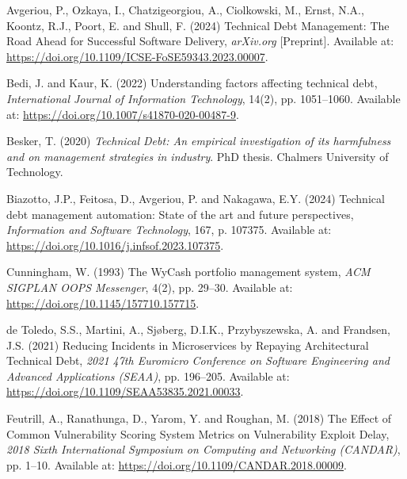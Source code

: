 \documentclass[
  british,
  12pt,
  a4paper,
]{report}
\newlength{\cslhangindent}
\newenvironment{CSLReferences}[2] %
 {\begin{list}{}{%
  \setlength{\itemindent}{0pt}
  \setlength{\leftmargin}{0pt}
  \setlength{\parsep}{0pt}
  \ifodd #1
   \setlength{\leftmargin}{\cslhangindent}
   \setlength{\itemindent}{-1\cslhangindent}
  \fi
  \setlength{\itemsep}{#2\baselineskip}}}
 {\end{list}}
\begin{document}
\begin{CSLReferences}{0}{1}
Avgeriou, P., Ozkaya, I., Chatzigeorgiou, A., Ciolkowski, M., Ernst,
N.A., Koontz, R.J., Poort, E. and Shull, F. (2024)
\textquotesingle Technical {Debt Management}: {The Road Ahead} for
{Successful Software Delivery}\textquotesingle, \emph{arXiv.org}
{[}Preprint{]}. Available at:
\url{https://doi.org/10.1109/ICSE-FoSE59343.2023.00007}.

Bedi, J. and Kaur, K. (2022) \textquotesingle Understanding factors
affecting technical debt\textquotesingle, \emph{International Journal of
Information Technology}, 14(2), pp. 1051--1060. Available at:
\url{https://doi.org/10.1007/s41870-020-00487-9}.

Besker, T. (2020) \emph{Technical {Debt}: {An} empirical investigation
of its harmfulness and on management strategies in industry}. PhD
thesis. Chalmers University of Technology.

Biazotto, J.P., Feitosa, D., Avgeriou, P. and Nakagawa, E.Y. (2024)
\textquotesingle Technical debt management automation: {State} of the
art and future perspectives\textquotesingle, \emph{Information and
Software Technology}, 167, p. 107375. Available at:
\url{https://doi.org/10.1016/j.infsof.2023.107375}.

Cunningham, W. (1993) \textquotesingle The {WyCash} portfolio management
system\textquotesingle, \emph{ACM SIGPLAN OOPS Messenger}, 4(2), pp.
29--30. Available at: \url{https://doi.org/10.1145/157710.157715}.

de Toledo, S.S., Martini, A., Sjøberg, D.I.K., Przybyszewska, A. and
Frandsen, J.S. (2021) \textquotesingle Reducing {Incidents} in
{Microservices} by {Repaying Architectural Technical
Debt}\textquotesingle, \emph{2021 47th {Euromicro Conference} on
{Software Engineering} and {Advanced Applications} ({SEAA})}, pp.
196--205. Available at:
\url{https://doi.org/10.1109/SEAA53835.2021.00033}.

Feutrill, A., Ranathunga, D., Yarom, Y. and Roughan, M. (2018)
\textquotesingle The {Effect} of {Common Vulnerability Scoring System
Metrics} on {Vulnerability Exploit Delay}\textquotesingle, \emph{2018
{Sixth International Symposium} on {Computing} and {Networking}
({CANDAR})}, pp. 1--10. Available at:
\url{https://doi.org/10.1109/CANDAR.2018.00009}.


\end{CSLReferences}
\end{document}
